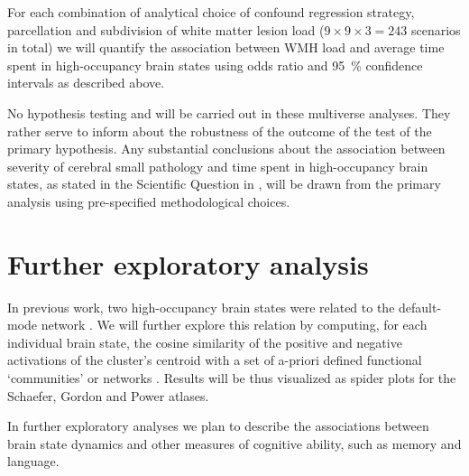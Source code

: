 

For each combination of analytical choice of confound regression strategy, parcellation and subdivision of white matter lesion load ($9\times9\times3=243$ scenarios in total) we will quantify the association between WMH load and average time spent in high-occupancy brain states using odds ratio and \qty{95}{\percent} confidence intervals as described above.

No hypothesis testing and will be carried out in these multiverse analyses. They rather serve to inform about the robustness of the outcome of the test of the primary hypothesis.
Any substantial conclusions about the association between severity of cerebral small pathology and time spent in high-occupancy brain states, as stated in the Scientific Question in , will be drawn from the primary analysis using pre-specified methodological choices.

\section{Further exploratory analysis}
In previous work, two high-occupancy brain states were related to the default-mode network \citep{Cornblath2020-fu}.
We will further explore this relation by computing, for each individual brain state, the cosine similarity of the positive and negative activations of the cluster’s centroid with a set of a-priori defined functional ‘communities’ or networks \citep{Schaefer2018-bo,Yeo2011-qg}.
Results will be thus visualized as spider plots for the Schaefer, Gordon and Power atlases.

In further exploratory analyses we plan to describe the associations between brain state dynamics and other measures of cognitive ability, such as memory and language.